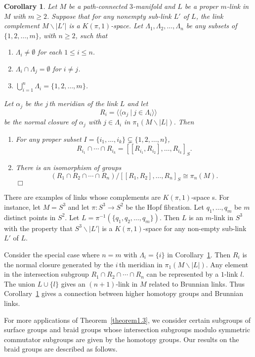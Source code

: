 \documentclass[10pt]{amsart}
\newtheorem{cor}[thm]{Corollary}
\let\la=\langle
\let\ra=\rangle
\numberwithin{equation}{section}
\begin{document}
\begin{cor}\label{corollary1.4}
Let $M$ be a path-connected $3$-manifold and $L$ be a proper $m$-link in $M$ with $m\geq 2$. Suppose that for any nonempty sub-link $L'$ of $L$, the link complement $M\smallsetminus |L'|$ is a $K(\pi,1)$-space. Let $\Lambda_1,\Lambda_2,\ldots,\Lambda_n$ be any subsets of $\{1,2,\ldots,m\}$, with $n\geq 2$, such that
\begin{enumerate}
\item[(i)] $\Lambda_i\not=\emptyset$ for each $1\leq i\leq n$.
\item[(ii)] $\Lambda_i\cap \Lambda_j=\emptyset$ for $i\not=j$.
\item[(iii)] $\bigcup_{i=1}^n \Lambda_i=\{1,2,\ldots,m\}$.
\end{enumerate}
Let $\alpha_j$ be the $j\,$th meridian of the link $L$ and let
$$
R_i=\la\la \alpha_j \ | \ j\in \Lambda_i\ra\ra
$$
be the normal closure of $\alpha_j$ with $j\in \Lambda_i$ in $\pi_1(M\smallsetminus |L|)$. Then
\begin{enumerate}
\item For any proper subset $I=\{i_1,\ldots,i_k\}\subsetneq \{1,2,\ldots,n\}$,
$$
R_{i_1}\cap\cdots\cap R_{i_k}=[[R_{i_1}, R_{i_2}],\ldots,R_{i_k}]_S.
$$
\item There is an isomorphism of groups
$$
(R_1\cap R_2\cap\cdots\cap R_n)/[[R_1,R_2],\ldots,R_n]_S\cong \pi_n(M).
$$\hfill $\Box$
\end{enumerate}
\end{cor}

There are examples of links whose complements are $K(\pi,1)$-space
s. For instance, let $M=S^3$ and let $\pi\colon S^3\to S^2$ be the
Hopf fibration. Let $q_1,\ldots,q_m$ be $m$ distinct points in
$S^2$. Let $L=\pi^{-1}(\{q_1,q_2,\ldots,q_m\})$. Then $L$ is an
$m$-link in $S^3$ with the property that $S^3\smallsetminus |L'|$ is
a $K(\pi,1)$-space  for any non-empty sub-link $L'$ of $L$.

Consider the special case where $n=m$ with $\Lambda_i=\{i\}$ in Corollary~\ref{corollary1.4}. Then $R_i$ is the normal closure generated by the $i\,$th meridian in $\pi_1(M\smallsetminus |L|)$. Any element in the intersection subgroup $R_1\cap R_2\cap\cdots\cap R_n$ can be represented by a $1$-link $l$. The union $L\cup \{l\}$ gives an $(n+1)$-link in $M$ related to Brunnian links. Thus Corollary~\ref{corollary1.4} gives a connection between higher homotopy groups and Brunnian links.

For more applications of Theorem~\ref{theorem1.3}, we consider certain subgroups of surface groups and braid groups whose intersection subgroups modulo symmetric commutator subgroups are given by the homotopy groups. Our results on the braid groups are described as follows.
\end{document}
